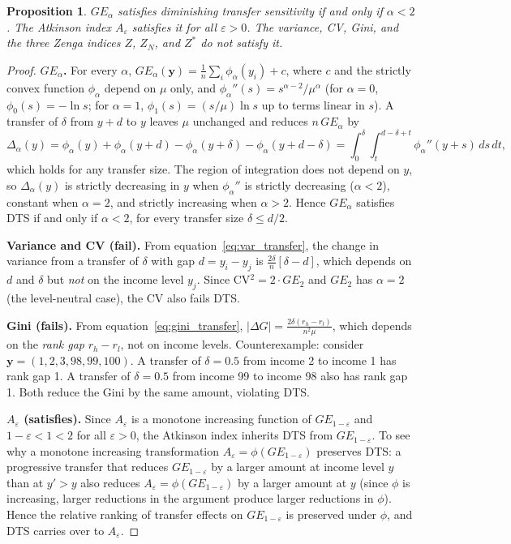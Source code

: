 \documentclass[12pt]{article}
\theoremstyle{plain}
\newtheorem{proposition}[theorem]{Proposition}
\theoremstyle{definition}
\theoremstyle{remark}
\newcommand{\bfy}{\mathbf{y}}
\begin{document}
\begin{proposition}\label{prop:dts}
$GE_\alpha$ satisfies diminishing transfer sensitivity if and only if $\alpha < 2$.
The Atkinson index $A_\varepsilon$ satisfies it for all $\varepsilon > 0$.
The variance, CV, Gini, and the three Zenga indices $Z$, $Z_N$, and $Z^*$ do not satisfy it.
\end{proposition}

\begin{proof}
\textbf{$GE_\alpha$.}
For every $\alpha$, $GE_\alpha(\bfy) = \frac{1}{n}\sum_i \phi_\alpha(y_i) + c$, where $c$ and the strictly convex function $\phi_\alpha$ depend on $\mu$ only, and $\phi_\alpha''(s) = s^{\alpha - 2}/\mu^\alpha$ (for $\alpha = 0$, $\phi_0(s) = -\ln s$; for $\alpha = 1$, $\phi_1(s) = (s/\mu)\ln s$ up to terms linear in $s$).
A transfer of $\delta$ from $y + d$ to $y$ leaves $\mu$ unchanged and reduces $n\,GE_\alpha$ by
\begin{equation}\label{eq:ge_sensitivity}
\Delta_\alpha(y) = \phi_\alpha(y) + \phi_\alpha(y + d) - \phi_\alpha(y + \delta) - \phi_\alpha(y + d - \delta) = \int_0^\delta \!\! \int_{t}^{d - \delta + t} \phi_\alpha''(y + s)\, ds\, dt,
\end{equation}
which holds for any transfer size.
The region of integration does not depend on $y$, so $\Delta_\alpha(y)$ is strictly decreasing in $y$ when $\phi_\alpha''$ is strictly decreasing ($\alpha < 2$), constant when $\alpha = 2$, and strictly increasing when $\alpha > 2$.
Hence $GE_\alpha$ satisfies DTS if and only if $\alpha < 2$, for every transfer size $\delta \leq d/2$.

\textbf{Variance and CV (fail).}
From equation~\eqref{eq:var_transfer}, the change in variance from a transfer of $\delta$ with gap $d = y_i - y_j$ is $\frac{2\delta}{n}[\delta - d]$, which depends on $d$ and $\delta$ but \emph{not} on the income level $y_j$.
Since CV$^2 = 2 \cdot GE_2$ and $GE_2$ has $\alpha = 2$ (the level-neutral case), the CV also fails DTS.

\textbf{Gini (fails).}
From equation~\eqref{eq:gini_transfer}, $|\Delta G| = \frac{2\delta(r_h - r_l)}{n^2\mu}$, which depends on the \emph{rank gap} $r_h - r_l$, not on income levels.
Counterexample: consider $\bfy = (1, 2, 3, 98, 99, 100)$.
A transfer of $\delta = 0.5$ from income 2 to income 1 has rank gap 1.
A transfer of $\delta = 0.5$ from income 99 to income 98 also has rank gap 1.
Both reduce the Gini by the same amount, violating DTS.

\textbf{$A_\varepsilon$ (satisfies).}
Since $A_\varepsilon$ is a monotone increasing function of $GE_{1-\varepsilon}$ and $1 - \varepsilon < 1 < 2$ for all $\varepsilon > 0$, the Atkinson index inherits DTS from $GE_{1-\varepsilon}$.
To see why a monotone increasing transformation $A_\varepsilon = \phi(GE_{1-\varepsilon})$ preserves DTS: a progressive transfer that reduces $GE_{1-\varepsilon}$ by a larger amount at income level $y$ than at $y' > y$ also reduces $A_\varepsilon = \phi(GE_{1-\varepsilon})$ by a larger amount at $y$ (since $\phi$ is increasing, larger reductions in the argument produce larger reductions in $\phi$).
Hence the relative ranking of transfer effects on $GE_{1-\varepsilon}$ is preserved under $\phi$, and DTS carries over to $A_\varepsilon$.


\end{proof}
\end{document}
